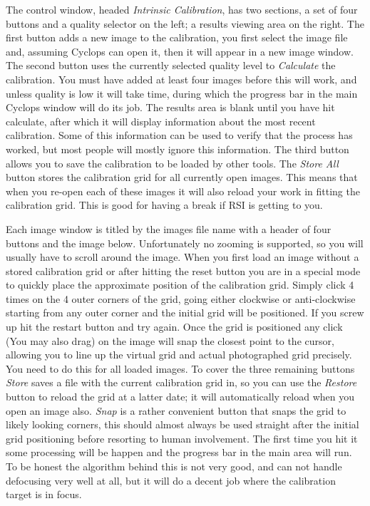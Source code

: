\documentclass[10pt,a4paper,twoside]{article}
\begin{document}
The control window, headed \emph{Intrinsic Calibration}, has two sections, a set of four buttons and a quality selector on the left; a results viewing area on the right. The first button adds a new image to the calibration, you first select the image file and, assuming Cyclops can open it, then it will appear in a new image window. The second button uses the currently selected quality level to \emph{Calculate} the calibration. You must have added at least four images before this will work, and unless quality is low it will take time, during which the progress bar in the main Cyclops window will do its job. The results area is blank until you have hit calculate, after which it will display information about the most recent calibration. Some of this information can be used to verify that the process has worked, but most people will mostly ignore this information. The third button allows you to save the calibration to be loaded by other tools. The \emph{Store All} button stores the calibration grid for all currently open images. This means that when you re-open each of these images it will also reload your work in fitting the calibration grid. This is good for having a break if RSI is getting to you.

Each image window is titled by the images file name with a header of four buttons and the image below. Unfortunately no zooming is supported, so you will usually have to scroll around the image. When you first load an image without a stored calibration grid or after hitting the reset button you are in a special mode to quickly place the approximate position of the calibration grid. Simply click 4 times on the 4 outer corners of the grid, going either clockwise or anti-clockwise starting from any outer corner and the initial grid will be positioned. If you screw up hit the restart button and try again. Once the grid is positioned any click (You may also drag) on the image will snap the closest point to the cursor, allowing you to line up the virtual grid and actual photographed grid precisely. You need to do this for all loaded images. To cover the three remaining buttons \emph{Store} saves a file with the current calibration grid in, so you can use the \emph{Restore} button to reload the grid at a latter date; it will automatically reload when you open an image also. \emph{Snap} is a rather convenient button that snaps the grid to likely looking corners, this should almost always be used straight after the initial grid positioning before resorting to human involvement. The first time you hit it some processing will be happen and the progress bar in the main area will run. To be honest the algorithm behind this is not very good, and can not handle defocusing very well at all, but it will do a decent job where the calibration target is in focus.
\end{document}
